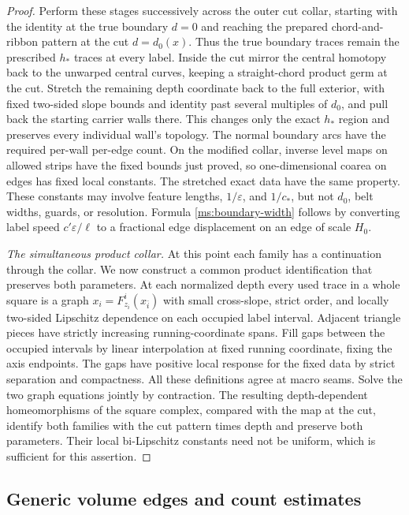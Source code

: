 \documentclass[11pt]{article}
\numberwithin{equation}{section}
\theoremstyle{definition}
\theoremstyle{remark}
\begin{document}
\begin{proof}
Perform these stages successively across the outer cut collar, starting
with the identity at the true boundary $d=0$ and reaching the prepared
chord-and-ribbon pattern at the cut $d=d_0(x)$.  Thus the true boundary
traces remain the prescribed $h_*$ traces at every label.
Inside the cut mirror
the central homotopy back to the unwarped central curves, keeping a
straight-chord product germ at the cut.  Stretch the remaining depth
coordinate back to the full exterior, with fixed two-sided slope
bounds and identity past several multiples of $d_0$, and pull back
the starting carrier walls there.  This changes only the exact
$h_*$ region and preserves every individual wall's topology.
The normal boundary arcs have the required per-wall per-edge count.
On the modified collar, inverse level maps on allowed strips have
the fixed bounds just proved, so one-dimensional coarea on edges
has fixed local constants.  The stretched exact data have the same
property.  These constants may involve feature lengths,
$1/\varepsilon$, and $1/c_*$, but not $d_0$, belt widths, guards, or
resolution.  Formula \eqref{ms:boundary-width} follows by converting
label speed $c'\varepsilon/\ell$ to a fractional edge displacement
on an edge of scale $H_0$.

\emph{The simultaneous product collar.}
At this point each family has a continuation through the collar.  We
now construct a common product identification that preserves both
parameters.  At each normalized depth every used trace
in a whole square is a graph
$x_i=F^i_{z_i}(x_{\bar i})$ with small cross-slope, strict order,
and locally two-sided Lipschitz dependence on each occupied label
interval.  Adjacent triangle pieces have strictly increasing
running-coordinate spans.  Fill gaps between the occupied intervals
by linear interpolation at fixed running coordinate, fixing the
axis endpoints.  The gaps have positive local response for the
fixed data by strict separation and compactness.  All these
definitions agree at macro seams.  Solve the two graph equations
jointly by contraction.  The resulting depth-dependent
homeomorphisms of the square complex, compared with the map at the
cut, identify both families with the cut pattern times depth and
preserve both parameters.  Their local bi-Lipschitz constants need
not be uniform, which is sufficient for this assertion.
\end{proof}

\subsection{Generic volume edges and count estimates}
\end{document}
